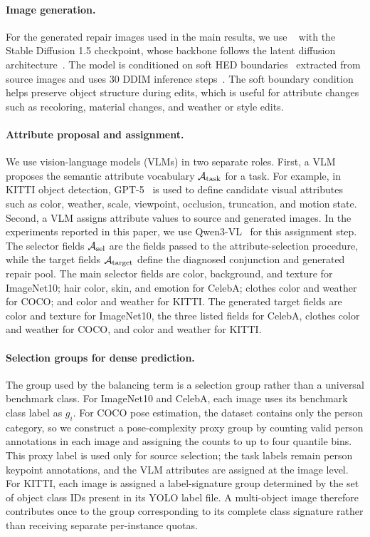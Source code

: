 \paragraph{Image generation.}
For the generated repair images used in the main results, we use \controlnet~\citep{zhang2023adding} with the Stable Diffusion 1.5 checkpoint, whose backbone follows the latent diffusion architecture~\citep{rombach2022high}. The model is conditioned on soft HED boundaries~\citep{xie2015holistically} extracted from source images and uses 30 DDIM inference steps~\citep{ddim}. The soft boundary condition helps preserve object structure during edits, which is useful for attribute changes such as recoloring, material changes, and weather or style edits.

\paragraph{Attribute proposal and assignment.}
We use vision-language models (VLMs) in two separate roles. First, a VLM proposes the semantic attribute vocabulary $\mathcal{A}_{\mathrm{task}}$ for a task. For example, in KITTI object detection, GPT-5~\citep{openai2025gpt5} is used to define candidate visual attributes such as color, weather, scale, viewpoint, occlusion, truncation, and motion state. Second, a VLM assigns attribute values to source and generated images. In the experiments reported in this paper, we use Qwen3-VL~\citep{bai2025qwen3vl} for this assignment step. The selector fields $\mathcal{A}_{\mathrm{sel}}$ are the fields passed to the attribute-selection procedure, while the target fields $\mathcal{A}_{\mathrm{target}}$ define the diagnosed conjunction and generated repair pool. The main selector fields are color, background, and texture for ImageNet10; hair color, skin, and emotion for CelebA; clothes color and weather for COCO; and color and weather for KITTI. The generated target fields are color and texture for ImageNet10, the three listed fields for CelebA, clothes color and weather for COCO, and color and weather for KITTI.

\paragraph{Selection groups for dense prediction.}
The group used by the balancing term is a selection group rather than a universal benchmark class. For ImageNet10 and CelebA, each image uses its benchmark class label as $g_i$. For COCO pose estimation, the dataset contains only the person category, so we construct a pose-complexity proxy group by counting valid person annotations in each image and assigning the counts to up to four quantile bins. This proxy label is used only for source selection; the task labels remain person keypoint annotations, and the VLM attributes are assigned at the image level. For KITTI, each image is assigned a label-signature group determined by the set of object class IDs present in its YOLO label file. A multi-object image therefore contributes once to the group corresponding to its complete class signature rather than receiving separate per-instance quotas.


